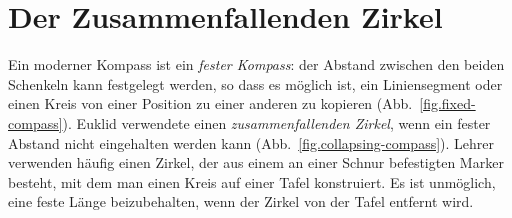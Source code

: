 
\chapter{Der Zusammenfallenden Zirkel}\label{c.collapse}


Ein moderner Kompass ist ein \emph{fester Kompass}: der Abstand zwischen den beiden Schenkeln kann festgelegt werden, so dass es möglich ist, ein Liniensegment oder einen Kreis von einer Position zu einer anderen zu kopieren (Abb.~\ref{fig.fixed-compass}). Euklid verwendete einen \emph{zusammenfallenden Zirkel}, wenn ein fester Abstand nicht eingehalten werden kann (Abb.~\ref{fig.collapsing-compass}). Lehrer verwenden häufig einen Zirkel, der aus einem an einer Schnur befestigten Marker besteht, mit dem man einen Kreis auf einer Tafel konstruiert. Es ist unmöglich, eine feste Länge beizubehalten, wenn der Zirkel von der Tafel entfernt wird. 

